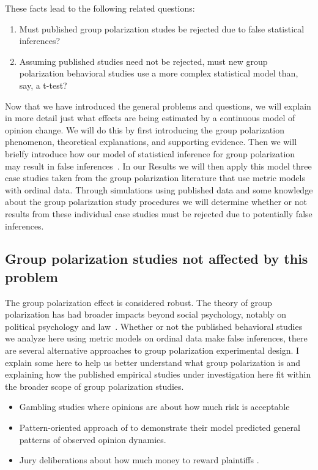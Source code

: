 \documentclass[11pt,letterpaper]{article}
\begin{document}
These facts lead to the following related questions:
\begin{enumerate}
  \item 
    Must published group polarization studes be rejected due to
    false statistical inferences?
  \item 
    Assuming published studies need not be rejected, must new group 
    polarization behavioral studies use a more complex
    statistical model than, say, a t-test? 
\end{enumerate}

Now that we have introduced the general problems and questions, we will explain
in more detail just what effects are being estimated by a continuous model
of opinion change. We will do this by first introducing the group polarization
phenomenon, theoretical explanations, and supporting evidence. Then we will
brielfy introduce how our model of statistical inference for group 
polarization may result in false inferences~\cite{Liddell2018}. In our
Results we will then apply this model three case studies taken from the
group polarization literature that use metric models with ordinal data.
Through simulations using published data and some knowledge about the
group polarization study procedures we will determine whether or not
results from these individual case studies must be rejected due to 
potentially false inferences.

\subsection{Group polarization studies not affected by this problem}

The group polarization effect is considered robust. The theory of group polarization has had
broader impacts beyond social psychology, notably on political psychology
and law~\cite{Sunstein2002,Sunstein2009,Sunstein2019}. Whether or not the 
published behavioral studies we analyze here using metric models on 
ordinal data make false inferences,  there are several alternative approaches
to group polarization experimental design. I explain some here to help us
better understand what group polarization is and explaining how the 
published empirical studies under investigation here fit within the broader
scope of group polarization studies.

\begin{itemize}
  \item Gambling studies where opinions are about how much risk is 
    acceptable \cite{Blascovich1973,Blascovich1974,Blascovich1975,Blascovich1975a,Blascovich1976}
  \item Pattern-oriented approach of  to demonstrate their
    model predicted general patterns of observed opinion dynamics.
  \item Jury deliberations about how much money to reward plaintiffs
    \cite{Myers1976,Kaplan1977,Schkade2000}.
\end{itemize}
\end{document}

